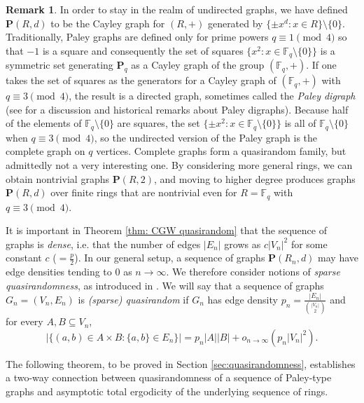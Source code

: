 \documentclass{amsart}
\theoremstyle{definition}
\newtheorem{remark}[theorem]{Remark}
\numberwithin{equation}{section}
\newcommand{\F}{\mathbb{F}}
\newcommand{\bfP}{\mathbf{P}}
\begin{document}
\begin{remark}
    In order to stay in the realm of undirected graphs, we have defined $\bfP(R,d)$ to be the Cayley graph for $(R,+)$ generated by $\{\pm x^d : x \in R\} \setminus \{0\}$.
    Traditionally, Paley graphs are defined only for prime powers $q \equiv 1 \pmod{4}$ so that $-1$ is a square and consequently the set of squares $\{x^2 : x \in \F_q \setminus \{0\}\}$ is a symmetric set generating $\bfP_q$ as a Cayley graph of the group $(\F_q,+)$.
    If one takes the set of squares as the generators for a Cayley graph of $(\F_q,+)$ with $q \equiv 3 \pmod{4}$, the result is a directed graph, sometimes called the \emph{Paley digraph} (see \cite[Section 9.7]{jones} for a discussion and historical remarks about Paley digraphs).
    Because half of the elements of $\F_q \setminus \{0\}$ are squares, the set $\{\pm x^2 : x \in \F_q \setminus \{0\}\}$ is all of $\F_q \setminus \{0\}$ when $q \equiv 3 \pmod{4}$, so the undirected version of the Paley graph is the complete graph on $q$ vertices.
    Complete graphs form a quasirandom family, but admittedly not a very interesting one.
    By considering more general rings, we can obtain nontrivial graphs $\bfP(R,2)$, and moving to higher degree produces graphs $\bfP(R,d)$ over finite rings that are nontrivial even for $R = \F_q$ with $q \equiv 3 \pmod{4}$.
\end{remark}

It is important in Theorem \ref{thm: CGW quasirandom} that the sequence of graphs is \emph{dense}, i.e. that the number of edges $|E_n|$ grows as $c|V_n|^2$ for some constant $c$ ($ = \frac{p}{2}$).
In our general setup, a sequence of graphs $\mathbf{P}(R_n,d)$ may have edge densities tending to 0 as $n \to \infty$.
We therefore consider notions of \emph{sparse quasirandomness}, as introduced in \cite{cg}.
We will say that a sequence of graphs $G_n = (V_n, E_n)$ is \emph{(sparse) quasirandom} if $G_n$ has edge density $p_n = \frac{|E_n|}{\binom{|V_n|}{2}}$ and for every $A, B \subseteq V_n$,
\begin{equation*}
    \left| \{(a,b) \in A \times B : \{a,b\} \in E_n\} \right| = p_n |A| |B| + o_{n \to \infty}(p_n|V_n|^2).
\end{equation*}

The following theorem, to be proved in Section \ref{sec:quasirandomness}, establishes a two-way connection between quasirandomness of a sequence of Paley-type graphs and asymptotic total ergodicity of the underlying sequence of rings.
\end{document}

